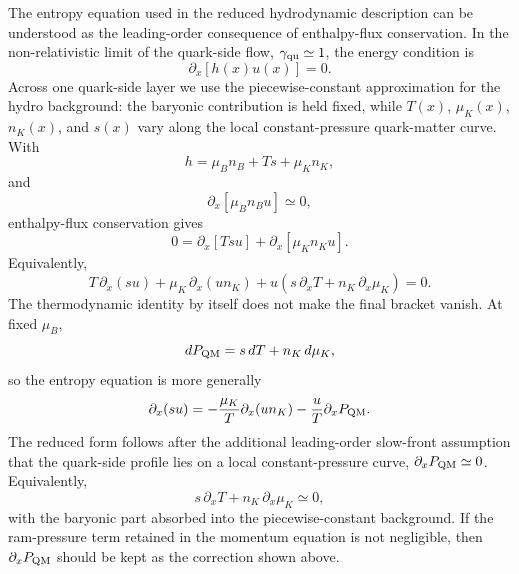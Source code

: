 The entropy equation used in the reduced hydrodynamic description can be
understood as the leading-order consequence of enthalpy-flux conservation. In
the non-relativistic limit of the quark-side flow,
\(\gamma_{\rm qu}\simeq 1\), the energy condition is
\begin{equation}
\partial_x\left[h(x)u(x)\right]=0.
\end{equation}
Across one quark-side layer we use the piecewise-constant approximation for the
hydro background: the baryonic contribution is held fixed, while
\(T(x)\), \(\mu_K(x)\), \(n_K(x)\), and \(s(x)\) vary along the local
constant-pressure quark-matter curve. With
\begin{equation}
h=\mu_B n_B+Ts+\mu_K n_K ,
\end{equation}
and
\begin{equation}
\partial_x\left[\mu_B n_B u\right]\simeq0,
\end{equation}
enthalpy-flux conservation gives
\begin{equation}
0
=
\partial_x\left[Tsu\right]
+
\partial_x\left[\mu_K n_K u\right].
\end{equation}
Equivalently,
\begin{equation}
T\,\partial_x(su)
+
\mu_K\,\partial_x(un_K)
+
u\left(s\,\partial_xT+n_K\,\partial_x\mu_K\right)
=0.
\end{equation}
The thermodynamic identity by itself does not make the final bracket vanish.
At fixed \(\mu_B\),
\begin{equation}
dP_{\rm QM}
=
s\,dT+n_K\,d\mu_K ,
\end{equation}
so the entropy equation is more generally
\begin{equation}
\partial_x(su)
=
-\frac{\mu_K}{T}\partial_x(un_K)
-\frac{u}{T}\partial_xP_{\rm QM}.
\end{equation}
The reduced form follows after the additional leading-order slow-front
assumption that the quark-side profile lies on a local constant-pressure curve,
\(\partial_xP_{\rm QM}\simeq0\). Equivalently,
\begin{equation}
s\,\partial_xT+n_K\,\partial_x\mu_K\simeq0,
\end{equation}
with the baryonic part absorbed into the piecewise-constant background. If the
ram-pressure term retained in the momentum equation is not negligible, then
\(\partial_xP_{\rm QM}\) should be kept as the correction shown above.


